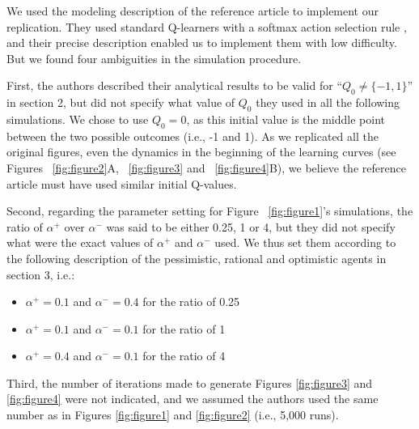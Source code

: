 \documentclass[10pt,a4paper,onecolumn]{article}
\newcommand{\tightlist}{%
  \setlength{\itemsep}{1pt}\setlength{\parskip}{0pt}\setlength{\parsep}{0pt}}
\begin{document}
We used the modeling description of the reference article to implement
our replication. They used standard Q-learners with a softmax action
selection rule \cite{sutton1998introduction}, and their precise
description enabled us to implement them with low difficulty. But we
found four ambiguities in the simulation procedure.

First, the authors described their analytical results to be valid for
``\(Q_0 \neq \{-1, 1\}\)'' in section 2, but did not specify what value
of \(Q_0\) they used in all the following simulations. We chose to use
\(Q_0 = 0\), as this initial value is the middle point between the two
possible outcomes (i.e., -1 and 1). As we replicated all the original
figures, even the dynamics in the beginning of the learning curves (see
Figures ~\ref{fig:figure2}A, ~\ref{fig:figure3} and ~\ref{fig:figure4}B),
we believe the reference article must have used similar initial
Q-values.

Second, regarding the parameter setting for Figure ~\ref{fig:figure1}'s
simulations, the ratio of \(\alpha^+\) over \(\alpha^-\) was said to be
either 0.25, 1 or 4, but they did not specify what were the exact values
of \(\alpha^+\) and \(\alpha^-\) used. We thus set them according to the
following description of the pessimistic, rational and optimistic agents
in section 3, i.e.:

\begin{itemize}
\tightlist
\item
  \(\alpha^+ = 0.1\) and \(\alpha^- = 0.4\) for the ratio of 0.25
\item
  \(\alpha^+ = 0.1\) and \(\alpha^- = 0.1\) for the ratio of 1
\item
  \(\alpha^+ = 0.4\) and \(\alpha^- = 0.1\) for the ratio of 4
\end{itemize}

Third, the number of iterations made to generate Figures
 \ref{fig:figure3} and \ref{fig:figure4} were not indicated, and we
assumed the authors used the same number as in Figures
 \ref{fig:figure1} and \ref{fig:figure2} (i.e., 5,000 runs).
\end{document}
